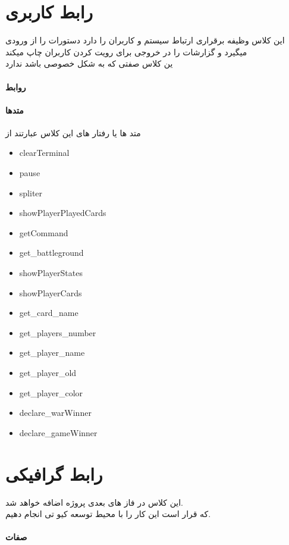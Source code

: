 \documentclass[pdf,titlepage,a4paper]{report}
\begin{document}
	\section{رابط کاربری}
	این کلاس وظیفه برقراری ارتباط سیستم و کاربران را دارد دستورات را از ورودی میگیرد و گزارشات را در خروجی برای رویت کردن کاربران چاپ میکند\\
    ین کلاس صفتی که به شکل خصوصی باشد ندارد 
	\paragraph{روابط}
	
	\paragraph{متدها}
	متد ها یا رفتار های این کلاس عبارتند از 
	\begin{latin}
		\begin{itemize}
			\item clearTerminal
			\item pause
			\item spliter
			\item showPlayerPlayedCards
			\item getCommand
			\item get\_battleground
			\item showPlayerStates 
			\item showPlayerCards
			\item get\_card\_name
			\item get\_players\_number
			\item get\_player\_name
			\item get\_player\_old
			\item get\_player\_color 
			\item declare\_warWinner
			\item declare\_gameWinner
		\end{itemize}
	\end{latin}
	
	\newpage
	\section{رابط گرافیکی}
	 این کلاس در فاز های بعدی پروژه اضافه خواهد شد. \\
	 که قرار است این کار را با محیط توسعه کیو تی انجام دهیم.
	\paragraph{صفات}
\end{document}
